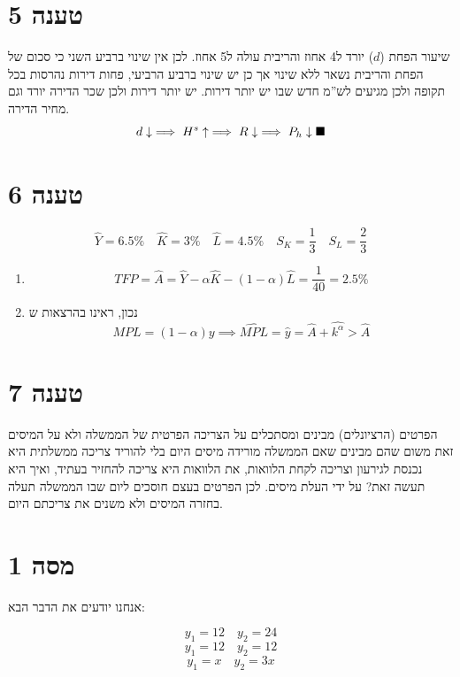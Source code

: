\documentclass[12pt]{article}
\renewcommand{\qed}{\hfill\blacksquare}
\begin{document}
\section*{טענה 5}
שיעור הפחת ($d$) יורד ל4 אחוז והריבית עולה ל5 אחוז. לכן אין שינוי ברביע השני כי סכום של הפחת והריבית נשאר ללא שינוי אך כן יש שינוי ברביע הרביעי, פחות דירות נהרסות בכל תקופה ולכן מגיעים לש''מ חדש שבו יש יותר דירות. יש יותר דירות ולכן שכר הדירה יורד וגם מחיר הדירה.
\begin{equation*}
    d \downarrow \implies H^s \uparrow \implies R \downarrow \implies P_h \downarrow \qed
\end{equation*}

\section*{טענה 6}
\begin{equation*}
    \widehat Y = 6.5\% \quad \widehat K = 3\% \quad \widehat L = 4.5\% \quad S_K = \frac{1}{3} \quad S_L = \frac{2}{3}
\end{equation*}
\begin{enumerate}
    \item $$TFP = \widehat A = \widehat Y - \alpha \widehat K - (1-\alpha) \widehat L = \frac{1}{40} = 2.5\% $$
    \item נכון, ראינו בהרצאות ש $$MPL = \left(1-\alpha\right) y \implies \widehat{MPL}  = \widehat{y}= \widehat A + \widehat{k^\alpha} > \widehat A$$
\end{enumerate}
\section*{טענה 7}
הפרטים (הרציונלים) מבינים ומסתכלים על הצריכה הפרטית של הממשלה ולא על המיסים זאת משום שהם מבינים שאם הממשלה מורידה מיסים היום בלי להוריד צריכה ממשלתית היא נכנסת לגירעון וצריכה לקחת הלוואות, את הלוואות היא צריכה להחזיר בעתיד, ואיך היא תעשה זאת? על ידי העלת מיסים. לכן הפרטים בעצם חוסכים ליום שבו הממשלה תעלה בחזרה המיסים ולא משנים את צריכתם היום.

\newpage

\section*{מסה 1}
אנחנו יודעים את הדבר הבא:

\begin{equation}
    y_1 = 12 \quad  y_2 = 24
\end{equation}
\begin{equation}
    y_1 = 12 \quad  y_2 = 12
\end{equation}
\begin{equation}
    y_1 = x \quad  y_2 = 3x
\end{equation}
\end{document}

